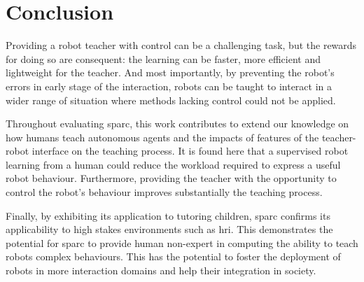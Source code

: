 \section{Conclusion}\label{sec:conc_conc}


Providing a robot teacher with control can be a challenging task, but the rewards for doing so are consequent: the learning can be faster, more efficient and lightweight for the teacher. And most importantly, by preventing the robot's errors in early stage of the interaction, robots can be taught to interact in a wider range of situation where methods lacking control could not be applied.

Throughout evaluating \gls{sparc}, this work contributes to extend our knowledge on how humans teach autonomous agents and the impacts of features of the teacher-robot interface on the teaching process. It is found here that a supervised robot learning from a human could reduce the workload required to express a useful robot behaviour. Furthermore, providing the teacher with the opportunity to control the robot's behaviour improves substantially the teaching process.

Finally, by exhibiting its application to tutoring children, \gls{sparc} confirms its applicability to high stakes environments such as \gls{hri}. This demonstrates the potential for \gls{sparc} to provide human non-expert in computing the ability to teach robots complex behaviours. This has the potential to foster the deployment of robots in more interaction domains and help their integration in society.